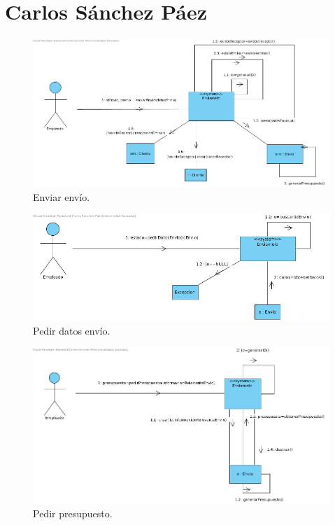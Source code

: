 \documentclass[12pt,spanish]{article}
\begin{document}
\section{Carlos Sánchez Páez}

\begin{figure}[H]
\centering
\includegraphics[scale=0.5]{enviarEnvio.png}
\caption{Enviar envío.}
\end{figure}

\begin{figure}[H]
\centering
\includegraphics[scale=0.5]{pedirDatosEnvio.png}
\caption{Pedir datos envío.}
\end{figure}

\begin{figure}[H]
\centering
\includegraphics[scale=0.5]{pedirPresupuesto.png}
\caption{Pedir presupuesto.}
\end{figure}
\end{document}
